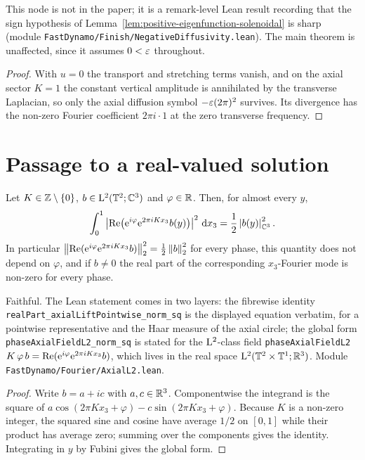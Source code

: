 This node is not in the paper; it is a remark-level Lean result recording that the sign
hypothesis of Lemma~\ref{lem:positive-eigenfunction-solenoidal} is sharp (module \texttt{FastDynamo/Finish/NegativeDiffusivity.lean}).  The main theorem is
unaffected, since it assumes $0<\varepsilon$ throughout.

\begin{proof}
  \leanok
  With $u=0$ the transport and stretching terms vanish, and on the axial sector $K=1$ the constant
  vertical amplitude is annihilated by the transverse Laplacian, so only the axial diffusion symbol
  $-\varepsilon(2\pi)^2$ survives.  Its divergence has the non-zero Fourier coefficient
  $2\pi i\cdot1$ at the zero transverse frequency.
\end{proof}

\section{Passage to a real-valued solution}

\begin{lemma}
  \label{lem:real-axial-mode}
  \leanok
  Let $K\in\mathbb{Z}\setminus\{0\}$, $b\in\mathrm{L}^2(\mathbb{T}^2;\mathbb{C}^3)$ and $\varphi\in\mathbb{R}$.  Then, for almost every
  $y$,
  \[
    \int_0^1\left\lvert\operatorname{Re}\bigl(\mathrm{e}^{i\varphi}\mathrm{e}^{2\pi iKx_3}b(y)\bigr)\right\rvert^2\,\mathrm{d} x_3
    =\frac12\left\lvert b(y)\right\rvert_{\mathbb{C}^3}^2 .
  \]
  In particular $\left\|\operatorname{Re}(\mathrm{e}^{i\varphi}\mathrm{e}^{2\pi iKx_3}b)\right\|_2^2=\frac12\left\|b\right\|_2^2$ for every phase,
  this quantity does not depend on $\varphi$, and if $b\neq0$ the real part of the corresponding
  $x_3$-Fourier mode is non-zero for every phase.
\end{lemma}

Faithful.  The Lean statement comes in two layers: the fibrewise identity
\texttt{realPart\_axialLiftPointwise\_norm\_sq} is the displayed equation verbatim, for a
pointwise representative and the Haar measure of the axial circle; the global form
\texttt{phaseAxialFieldL2\_norm\_sq} is stated for the $\mathrm{L}^2$-class field
\texttt{phaseAxialFieldL2}~$K\,\varphi\,b=\operatorname{Re}(\mathrm{e}^{i\varphi}\mathrm{e}^{2\pi iKx_3}b)$, which lives in the
real space $\mathrm{L}^2(\mathbb{T}^2\times\mathbb{T}^1;\mathbb{R}^3)$.  Module
\texttt{FastDynamo/Fourier/AxialL2.lean}.

\begin{proof}
  \leanok
  Write $b=a+ic$ with $a,c\in\mathbb{R}^3$.  Componentwise the integrand is the square of
  $a\cos(2\pi Kx_3+\varphi)-c\sin(2\pi Kx_3+\varphi)$.  Because $K$ is a non-zero integer, the
  squared sine and cosine have average $1/2$ on $[0,1]$ while their product has average zero;
  summing over the components gives the identity.  Integrating in $y$ by Fubini gives the global
  form.
\end{proof}

